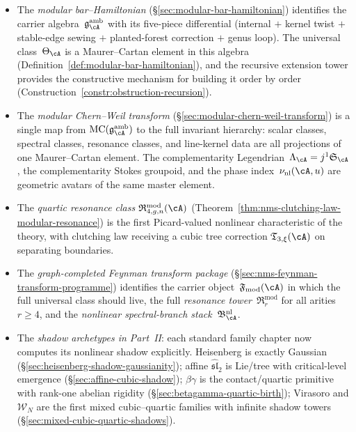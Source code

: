 \begin{itemize}
\item The \emph{modular bar--Hamiltonian}
  (\S\ref{sec:modular-bar-hamiltonian}) identifies the carrier
  algebra~$\mathfrak{g}^{\mathrm{amb}}_\cA$ with its five-piece
  differential (internal $+$ kernel twist $+$ stable-edge sewing
  $+$ planted-forest correction $+$ genus loop).  The universal
  class~$\Theta_\cA$ is a Maurer--Cartan element in this algebra
  (Definition~\ref{def:modular-bar-hamiltonian}), and the recursive
  extension tower provides the constructive mechanism for building
  it order by order
  (Construction~\ref{constr:obstruction-recursion}).
\item The \emph{modular Chern--Weil transform}
  (\S\ref{sec:modular-chern-weil-transform}) is a single map from
  $\operatorname{MC}(\mathfrak{g}^{\mathrm{amb}}_\cA)$ to the full
  invariant hierarchy: scalar classes, spectral classes, resonance
  classes, and line-kernel data are all projections of
  one Maurer--Cartan element.  The complementarity
  Legendrian~$\Lambda_\cA = j^1\mathfrak{S}_\cA$, the
  complementarity Stokes groupoid, and the phase
  index~$\nu_{\mathrm{nl}}(\cA,u)$ are geometric avatars of the
  same master element.
\item The \emph{quartic resonance class}
  $\mathfrak{R}_{4,g,n}^{\mathrm{mod}}(\cA)$
  (Theorem~\ref{thm:nms-clutching-law-modular-resonance}) is the
  first Picard-valued nonlinear characteristic of the theory, with
  clutching law receiving a cubic tree correction
  $\mathfrak{T}_{3,\xi}(\cA)$ on separating boundaries.
\item The \emph{graph-completed Feynman transform package}
  (\S\ref{sec:nms-feynman-transform-programme}) identifies the
  carrier object~$\mathfrak{F}_{\mathrm{mod}}(\cA)$ in which the
  full universal class should live, the full
  \emph{resonance tower}~$\mathfrak{R}^{\mathrm{mod}}_{r}$ for all
  arities~$r \ge 4$, and the \emph{nonlinear
  spectral-branch stack}~$\mathfrak{B}^{\mathrm{nl}}_\cA$.
\item The \emph{shadow archetypes in Part~II}: each standard
  family chapter now computes its nonlinear shadow explicitly.
  Heisenberg is exactly Gaussian
  (\S\ref{sec:heisenberg-shadow-gaussianity}); affine
  $\widehat{\mathfrak{sl}}_2$ is Lie/tree with critical-level
  emergence (\S\ref{sec:affine-cubic-shadow}); $\beta\gamma$ is
  the contact/quartic primitive with rank-one abelian rigidity
  (\S\ref{sec:betagamma-quartic-birth}); Virasoro and
  $\mathcal{W}_N$ are the first mixed cubic--quartic families with
  infinite shadow towers (\S\ref{sec:mixed-cubic-quartic-shadows}).

\end{itemize}
